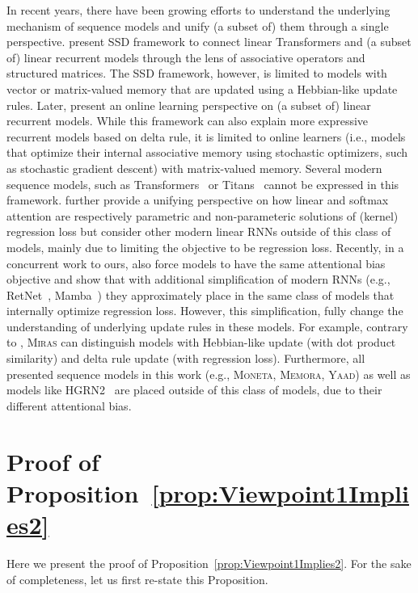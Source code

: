 \documentclass{article}
\newcommand{\citep}{\parencite}
\newcommand{\citet}{\textcite}
\newcommand{\framework}[0]{\textsc{Miras}}
\newcommand{\ymodel}[0]{\textsc{Yaad}}
\newcommand{\mmodel}[0]{\textsc{Moneta}}
\newcommand{\xmodel}[0]{\textsc{Memora}}
\theoremstyle{plain}
\theoremstyle{definition}
\theoremstyle{remark}
\newcommand{\head}[1]{\vspace{1.7mm}\noindent{{\textcolor{c2}{\bf #1.}}}}
\begin{document}
\head{Unifying Frameworks}
In recent years, there have been growing efforts to understand the underlying mechanism of sequence models and unify (a subset of) them through a single perspective. \citet{dao2024transformers} present SSD framework to connect linear Transformers and (a subset of) linear recurrent models through the lens of associative operators and structured matrices. The SSD framework, however, is limited to models with vector or matrix-valued memory that are updated using a Hebbian-like update rules. Later, \citet{liu2024longhorn} present an online learning perspective on (a subset of) linear recurrent models. While this framework can also explain more expressive recurrent models based on delta rule, it is limited to online learners (i.e., models that optimize their internal associative memory using stochastic optimizers, such as stochastic gradient descent) with matrix-valued memory. Several modern sequence models, such as Transformers~\citep{transformers} or Titans~\citep{behrouz2024titans} cannot be expressed in this framework.  \citet{sun2024learning} further provide a unifying perspective on how linear and softmax attention are respectively parametric and non-parameteric solutions of (kernel) regression loss but consider other modern linear RNNs outside of this class of models, mainly due to limiting the objective to be regression loss. Recently, in a concurrent work to ours, \citet{wang2025test} also force models to have the same attentional bias objective and show that with additional simplification of modern RNNs (e.g., RetNet~\citep{sun2023retentive}, Mamba~\citep{dao2024transformers}) they approximately place in the same class of models that internally optimize regression loss. However, this simplification, fully change the understanding of underlying update rules in these models. For example, contrary to \citet{wang2025test}, \framework{} can distinguish models with Hebbian-like update (with dot product similarity) and delta rule update (with regression loss). Furthermore, all presented sequence models in this work (e.g., \mmodel, \xmodel, \ymodel) as well as models like HGRN2~\citep{qin2024hgrn} are placed outside of this class of models, due to their different attentional bias.





\section{Proof of Proposition~\ref{prop:Viewpoint1Implies2}} \label{app:proof}
Here we present the proof of Proposition~\ref{prop:Viewpoint1Implies2}. For the sake of completeness, let us first re-state this Proposition.
\end{document}
